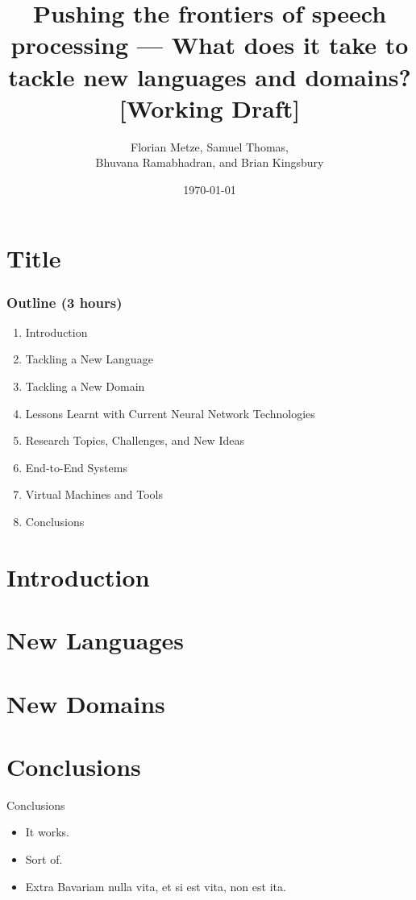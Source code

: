 \documentclass[12pt,xcolor=dvipsnames]{beamer}
\author{Florian Metze, Samuel Thomas, \\
  Bhuvana Ramabhadran, and Brian Kingsbury}
\title{{\color{Maroon} Pushing the frontiers of speech processing --- What does it take to tackle new languages and domains? [Working Draft]}}
\institute{Carnegie Mellon University and IBM}
\date{\today}
\begin{document}
\section{Title}

\begin{frame}
  \titlepage
\end{frame}



\begin{frame}
  \frametitle{Outline (3 hours)}
  \begin{enumerate}
  \item Introduction
  \item Tackling a New Language
  \item Tackling a New Domain
  \item Lessons Learnt with Current Neural Network Technologies
  \item Research Topics, Challenges, and New Ideas
  \item End-to-End Systems
  \item Virtual Machines and Tools
  \item Conclusions
  \end{enumerate}
\end{frame}

\section{Introduction}


\section{New Languages}


\section{New Domains}




\section{Conclusions}
\begin{frame}{Conclusions}
  \begin{itemize}
  \item It works.
  \item Sort of.
  \item Extra Bavariam nulla vita, et si est vita, non est ita.
  \end{itemize}
\end{frame}
\end{document}
